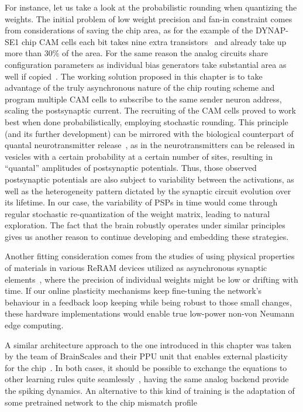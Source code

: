 For instance, let us take a look at the probabilistic rounding when quantizing the weights. The initial problem of low weight precision and fan-in constraint comes from considerations of saving the chip area, as for the example of the DYNAP-SE1 chip CAM cells each bit takes nine extra transistors~\cite{Pagiamtzis_Sheikholeslami06} and already take up more than 30\% of the area. For the same reason the analog circuits share configuration parameters as individual bias generators take substantial area as well if copied~\cite{Delbruck_etal10}. The working solution proposed in this chapter is to take advantage of the truly asynchronous nature of the chip routing scheme and program multiple CAM cells to subscribe to the same sender neuron address, scaling the postsynaptic current. The recruiting of the CAM cells proved to work best when done probabilistically, employing stochastic rounding. This principle (and its further development) can be mirrored with the biological counterpart of quantal neurotransmitter release~\cite{Redman90}, as in the neurotransmitters can be released in vesicles with a certain probability at a certain number of sites, resulting in ``quantal'' amplitudes of postsynaptic potentials. Thus, those observed postsynaptic potentials are also subject to variability between the activations, as well as the heterogeneity pattern dictated by the synaptic circuit evolution over its lifetime. In our case, the variability of PSPs in time would come through regular stochastic re-quantization of the weight matrix, leading to natural exploration. The fact that the brain robustly operates under similar principles gives us another reason to continue developing and embedding these strategies.

Another fitting consideration comes from the studies of using physical properties of materials in various ReRAM devices utilized as asynchronous synaptic elements~\cite{Covi_etal18, Covi_etal21, Dalgaty_etal24}, where the precision of individual weights might be low or drifting with time. If our online plasticity mechanisms keep fine-tuning the network's behaviour in a feedback loop keeping while being robust to those small changes, these hardware implementations would enable true low-power non-von Neumann edge computing.

A similar architecture approach to the one introduced in this chapter was taken by the team of BrainScales and their PPU unit that enables external plasticity for the chip~\cite{Pehle_etal22}. In both cases, it should be possible to exchange the equations to other learning rules quite seamlessly~\cite{Khacef_etal23}, having the same analog backend provide the spiking dynamics. An alternative to this kind of training is the adaptation of some pretrained network to the chip mismatch profile~\cite{Buchel_etal21}

